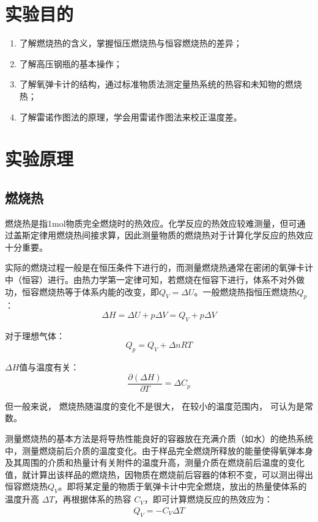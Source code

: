 \documentclass{pkureport}
\begin{document}
	\makeheader
	\section{实验目的}
		\begin{enumerate}
			\item 了解燃烧热的含义，掌握恒压燃烧热与恒容燃烧热的差异；
			
			\item 了解高压钢瓶的基本操作；
			
			\item 了解氧弹卡计的结构，通过标准物质法测定量热系统的热容和未知物的燃烧热；
			
			\item 了解雷诺作图法的原理，学会用雷诺作图法来校正温度差。
		\end{enumerate}
	\section{实验原理}
		\subsection{燃烧热}
		燃烧热是指1mol物质完全燃烧时的热效应。化学反应的热效应较难测量，但可通过盖斯定律用燃烧热间接求算，因此测量物质的燃烧热对于计算化学反应的热效应十分重要。
		
		实际的燃烧过程一般是在恒压条件下进行的，而测量燃烧热通常在密闭的氧弹卡计中（恒容）进行。由热力学第一定律可知，若燃烧在恒容下进行，体系不对外做功，恒容燃烧热等于体系内能的改变，即$Q_{V}=\Delta U$。一般燃烧热指恒压燃烧热$Q_{p}$：$$\Delta H=\Delta U+p \Delta V=Q_{V}+p \Delta V$$
	
		对于理想气体：$$Q_{p}=Q_{V}+\Delta n R T$$
		
		$\Delta H$值与温度有关：$$\frac{\partial\left(\Delta H\right)}{\partial T}=\Delta C_{p}$$
		
		但一般来说， 燃烧热随温度的变化不是很大， 在较小的温度范围内， 可认为是常数。
	
		测量燃烧热的基本方法是将导热性能良好的容器放在充满介质（如水）的绝热系统中，测量燃烧前后介质的温度变化。由于样品完全燃烧所释放的能量使得氧弹本身及其周围的介质和热量计有关附件的温度升高，测量介质在燃烧前后温度的变化值，就计算出该样品的燃烧热，因物质在燃烧前后容器的体积不变，可以测出得出恒容燃烧热$Q_V$。即将某定量的物质于氧弹卡计中完全燃烧，放出的热量使体系的温度升高 $\Delta T$，再根据体系的热容 $C_{V}$，即可计算燃烧反应的热效应为：
		\begin{align}
			Q_{V}=-C_{V} \Delta T\label{1}
		\end{align}
		
\end{document}
